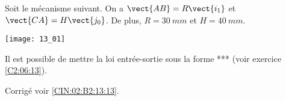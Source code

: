 \normaltrue \difficilefalse \tdifficilefalse
\correctionfalse


\setcounter{question}{0}%
\ifcorrection
\else
{}
\fi

\ifprof
\else
Soit le mécanisme suivant. On a $\vect{AB}=R\vect{i_1}$ et $\vect{CA}=H\vect{j_0}$. De plus, 
$R=\SI{30}{mm}$ et $H=\SI{40}{mm}$. 

\begin{marginfigure}
\texttt{[image: 13\_01]}
\end{marginfigure}
\fi

Il est possible de mettre la loi entrée-sortie sous la forme *** (voir exercice \ref{C2:06:13}).

\ifprof
\else
\fi

\ifprof
\else
\fi

\ifprof
\else
\begin{flushright}
\footnotesize{Corrigé  voir \ref{CIN:02:B2:13:13}.}
\end{flushright}%
\fi